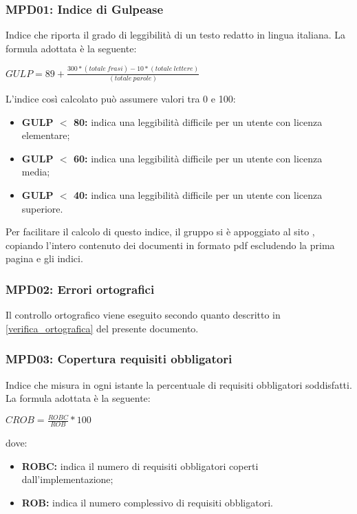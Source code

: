 \subsubsection{MPD01: Indice di Gulpease}\label{sssec:indice_gulpease}
Indice che riporta il grado di leggibilità di un testo redatto in lingua italiana.
La formula adottata è la seguente:
\begin{center}
    $GULP = 89 + \displaystyle \frac{300*(totale\ frasi)-10*(totale\ lettere)}{(totale\ parole)}$
\end{center}
L'indice così calcolato può assumere valori tra 0 e 100:
\begin{itemize}
    \item \textbf{GULP $<$ 80:} indica una leggibilità difficile per un utente con licenza elementare;
    \item \textbf{GULP $<$ 60:} indica una leggibilità difficile per un utente con licenza media;
    \item \textbf{GULP $<$ 40:} indica una leggibilità difficile per un utente con licenza superiore.
\end{itemize}

Per facilitare il calcolo di questo indice, il gruppo si è appoggiato al sito \href{https://farfalla-project.org/readability_static/}, copiando
l'intero contenuto dei documenti in formato pdf escludendo la prima pagina e gli indici.

\subsubsection{MPD02: Errori ortografici}\label{sssec:errori_ortografici}
Il controllo ortografico viene eseguito secondo quanto descritto in \ref{verifica_ortografica} del presente documento.

\subsubsection{MPD03: Copertura requisiti obbligatori}\label{sssec:requisiti_obbligatori}
Indice che misura in ogni istante la percentuale di requisiti obbligatori soddisfatti.
La formula adottata è la seguente:
\begin{center}
    $CROB = \displaystyle \frac{ROBC}{ROB}*100$
\end{center}
dove:
\begin{itemize}
    \item \textbf{ROBC:} indica il numero di requisiti obbligatori coperti dall'implementazione;
    \item \textbf{ROB:} indica il numero complessivo di requisiti obbligatori.
\end{itemize}

